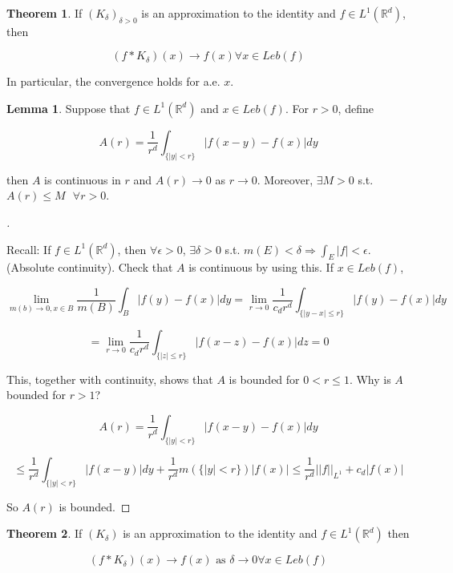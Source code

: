 \documentclass{article}
\theoremstyle{definition}
\newtheorem{thm}{Theorem}
\newtheorem{lem}{Lemma}
\newenvironment{proofs}[1][\proofname]{%
  \begin{proof}[#1]$ $\par\nobreak\ignorespaces
}{%
  \end{proof}
}
\begin{document}
\begin{thm}
  If $(K_\delta)_{\delta > 0}$ is an approximation to the identity and $f \in L^1(\mathbb{R}^d)$, then

  $$(f * K_\delta)(x) \to f(x) \forall x \in Leb(f)$$

  In particular, the convergence holds for a.e. $x$. 
\end{thm}

\begin{lem}
  Suppose that $f \in L^1(\mathbb{R}^d)$ and $x \in Leb(f)$. For $r > 0$, define 

  $$A(r) = \frac{1}{r^d} \int_{\{|y| < r\}} |f(x - y) - f(x)| dy$$

  then $A$ is continuous in $r$ and $A(r) \to 0$ as $r \to 0$. Moreover, $\exists M > 0$ s.t. $A(r) \leq M \text{ } \forall r > 0$. 

\end{lem}

\begin{proofs}
  Recall: If $f \in L^1(\mathbb{R}^d)$, then $\forall \epsilon > 0$, $\exists \delta > 0$ s.t. $m(E) < \delta \Rightarrow \int_E |f| < \epsilon$. (Absolute continuity). Check that $A$ is continuous by using this. If $x \in Leb(f)$, 

  $$\lim_{m(b) \to 0, x \in B} \frac{1}{m(B)} \int_B |f(y) - f(x)| dy = \lim_{r \to 0} \frac{1}{c_d r^d} \int_{\{|y - x| \leq r \}} |f(y) - f(x)| dy$$

  $$= \lim_{r \to 0} \frac{1}{c_dr^d} \int_{\{|z| \leq r\}} |f(x - z) - f(x)| dz = 0$$

  This, together with continuity, shows that $A$ is bounded for $0 < r \leq 1$. Why is $A$ bounded for $r > 1$?

  $$A(r) = \frac{1}{r^d} \int_{\{|y| < r\}} |f(x - y) - f(x)|dy$$

  $$\leq \frac{1}{r^d} \int_{\{|y| < r\}} |f(x - y)| dy + \frac{1}{r^d} m(\{|y| < r\}) |f(x)| \leq \frac{1}{r^d} ||f||_{L^1} + c_d |f(x)|$$

  So $A(r)$ is bounded. 

\end{proofs}

\begin{thm}
  If $(K_\delta)$ is an approximation to the identity and $f \in L^1(\mathbb{R}^d)$ then

  $$(f * K_\delta) (x) \rightarrow f(x) \text{ as } \delta \rightarrow 0 \forall x \in Leb(f)$$
\end{thm}
\end{document}
